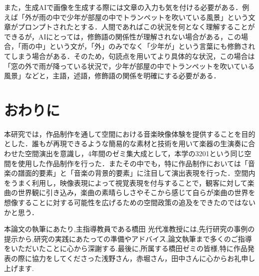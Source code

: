 また，生成AIで画像を生成する際には文章の入力も気を付ける必要がある．例えば「外が雨の中で少年が部屋の中でトランペットを吹いている風景」という文章がプロンプトされたとする．人間であればこの状況を何となく理解することができるが，AIにとっては，修飾語の関係性が理解されない場合がある，この場合，「雨の中」という文が，「外」のみでなく「少年が」という言葉にも修飾されてしまう場合がある．そのため，句読点を用いてより具体的な状況，この場合は「窓の外で雨が降っている状況で，少年が部屋の中でトランペットを吹いている風景」などと，主語，述語，修飾語の関係を明確にする必要がある．

\section{おわりに}
本研究では，作品制作を通して空間における音楽映像体験を提供することを目的とした．誰もが再現できるような簡易的な素材と技術を用いて楽器の生演奏に合わせた空間演出を意識し，4年間のゼミ集大成として，本学の3201という同じ空間を使用した作品制作を行った．またその中でも，特に作品制作においては「音楽の譜面的要素」と「音楽の背景的要素」に注目して演出表現を行った．空間内をうまく利用し，映像表現によって視覚表現を付与することで，観客に対して楽曲の世界観に引き込み，楽曲の素晴らしさやそこから感じて自らが楽曲の世界を想像することに対する可能性を広げるための空間政策の追及をできたのではないかと思う．






\begin{acknowledgment}
	本論文の執筆にあたり,主指導教員である橋田 光代准教授には,先行研究の事例の提示から,研究の実践にあたっての準備やアドバイス,論文執筆まで多くのご指導をいただいたことに心から深謝する.最後に,所属する橋田ゼミの皆様,特に作品発表の際に協力をしてくださった浅野さん，赤堀さん，田中さんに心からお礼申し上げます.
\end{acknowledgment}

